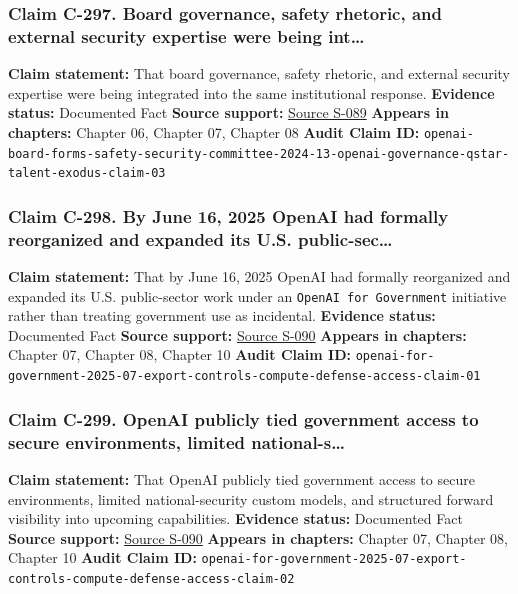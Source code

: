 \documentclass[
  american,
  11pt,
  letterpaper,
]{article}
\begin{document}
\subsubsection{Claim C-297. Board governance, safety rhetoric, and
external security expertise were being
int\ldots{}}\label{claim-c-297-board-governance-safety-rhetoric-and-external-security-expertise-were-being-int}

\textbf{Claim statement:} That board governance, safety rhetoric, and
external security expertise were being integrated into the same
institutional response. \textbf{Evidence status:} Documented Fact
\textbf{Source support:}
\hyperref[source-s-089-openai-board-forms-safety-and-security-committee]{Source
S-089} \textbf{Appears in chapters:} Chapter 06, Chapter 07, Chapter 08
\textbf{Audit Claim ID:}
\texttt{openai-board-forms-safety-security-committee-2024-13-openai-governance-qstar-talent-exodus-claim-03}

\subsubsection{Claim C-298. By June 16, 2025 OpenAI had formally
reorganized and expanded its U.S.
public-sec\ldots{}}\label{claim-c-298-by-june-16-2025-openai-had-formally-reorganized-and-expanded-its-u-s-public-sec}

\textbf{Claim statement:} That by June 16, 2025 OpenAI had formally
reorganized and expanded its U.S. public-sector work under an
\texttt{OpenAI\ for\ Government} initiative rather than treating
government use as incidental. \textbf{Evidence status:} Documented Fact
\textbf{Source support:}
\hyperref[source-s-090-introducing-openai-for-government]{Source S-090}
\textbf{Appears in chapters:} Chapter 07, Chapter 08, Chapter 10
\textbf{Audit Claim ID:}
\texttt{openai-for-government-2025-07-export-controls-compute-defense-access-claim-01}

\subsubsection{Claim C-299. OpenAI publicly tied government access to
secure environments, limited
national-s\ldots{}}\label{claim-c-299-openai-publicly-tied-government-access-to-secure-environments-limited-national-s}

\textbf{Claim statement:} That OpenAI publicly tied government access to
secure environments, limited national-security custom models, and
structured forward visibility into upcoming capabilities.
\textbf{Evidence status:} Documented Fact \textbf{Source support:}
\hyperref[source-s-090-introducing-openai-for-government]{Source S-090}
\textbf{Appears in chapters:} Chapter 07, Chapter 08, Chapter 10
\textbf{Audit Claim ID:}
\texttt{openai-for-government-2025-07-export-controls-compute-defense-access-claim-02}
\end{document}
